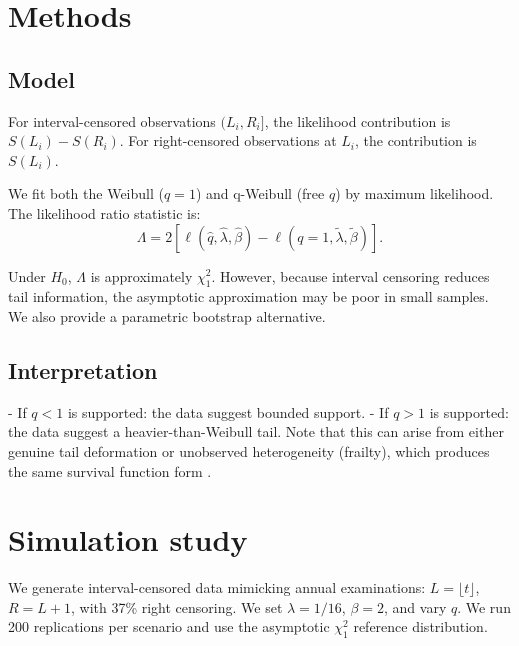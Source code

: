 \documentclass[11pt,a4paper]{article}
\begin{document}
\section{Methods}

\subsection{Model}

For interval-censored observations $(L_i, R_i]$, the likelihood contribution is $S(L_i) - S(R_i)$. For right-censored observations at $L_i$, the contribution is $S(L_i)$.

We fit both the Weibull ($q=1$) and q-Weibull (free $q$) by maximum likelihood. The likelihood ratio statistic is:
\begin{equation}
\Lambda = 2 \left[\ell(\hat{q}, \hat{\lambda}, \hat{\beta}) - \ell(q=1, \tilde{\lambda}, \tilde{\beta})\right].
\end{equation}

Under $H_0$, $\Lambda$ is approximately $\chi^2_1$. However, because interval censoring reduces tail information, the asymptotic approximation may be poor in small samples. We also provide a parametric bootstrap alternative.

\subsection{Interpretation}

- If $q < 1$ is supported: the data suggest bounded support.
- If $q > 1$ is supported: the data suggest a heavier-than-Weibull tail. Note that this can arise from either genuine tail deformation or unobserved heterogeneity (frailty), which produces the same survival function form \citep{hougaard2000frailty}.

\section{Simulation study}

We generate interval-censored data mimicking annual examinations: $L = \lfloor t \rfloor$, $R = L+1$, with 37\% right censoring. We set $\lambda=1/16$, $\beta=2$, and vary $q$. We run 200 replications per scenario and use the asymptotic $\chi^2_1$ reference distribution.
\end{document}
